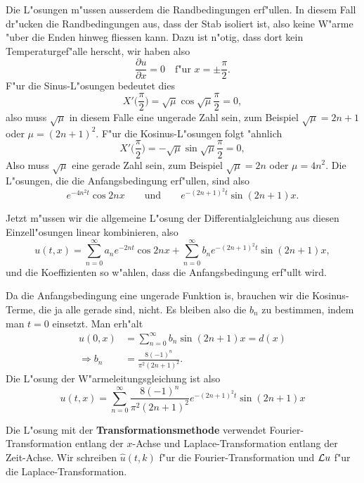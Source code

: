 {\begin{loesung}
Die L"osungen m"ussen ausserdem die Randbedingungen erf"ullen.
In diesem Fall dr"ucken die Randbedingungen aus, dass der Stab isoliert ist,
also keine W"arme "uber die Enden hinweg fliessen kann. Dazu ist n"otig,
dass dort kein Temperaturgef"alle herscht, wir haben also
\[\frac{\partial u}{\partial x}=0\quad\text{f"ur $x=\pm\frac{\pi}2$}.\]
F"ur die Sinus-L"osungen bedeutet dies
\[
X'\biggl(\frac{\pi}2\biggr)=\sqrt{\mu}\cos \sqrt{\mu}\frac{\pi}2=0,
\]
also muss $\sqrt{\mu}$ in diesem Falle eine ungerade Zahl sein,
zum Beispiel $\sqrt{\mu}=2n+1$ oder
$\mu=(2n+1)^2$.
F"ur die Kosinus-L"osungen folgt "ahnlich
\[
X'\biggl(\frac{\pi}2\biggr)=-\sqrt{\mu}\sin\sqrt{\mu}\frac{\pi}2=0,
\]
Also muss $\sqrt{\mu}$ eine gerade Zahl sein, zum Beispiel $\sqrt{\mu}=2n$ oder
$\mu=4n^2$.
Die L"osungen, die die Anfangsbedingung
erf"ullen, sind also
\[
e^{-4n^2t}\cos 2nx\qquad\text{und}\qquad e^{-(2n+1)^2t}\sin(2n+1)x.
\]

Jetzt m"ussen wir die allgemeine L"osung der Differentialgleichung aus
diesen Einzell"osungen linear kombinieren, also
\[
u(t,x)=
\sum_{n=0}^\infty a_ne^{-2nt}\cos 2nx +\sum_{n=0}^\infty b_n e^{-(2n+1)^2t}\sin(2n+1)x,
\]
und die Koeffizienten so w"ahlen, dass die Anfangsbedingung erf"ullt wird.

Da die Anfangsbedingung eine ungerade Funktion is, brauchen wir die Kosinus-Terme,
die ja alle gerade sind, nicht. Es bleiben also die $b_n$ zu bestimmen, indem
man $t=0$ einsetzt. Man erh"alt
\begin{align*}
u(0,x)&=\sum_{n=0}^\infty b_n\sin(2n+1)x=d(x)
\\
\Rightarrow
b_n&=\frac{8(-1)^n}{\pi^2(2n+1)^2}.
\end{align*}
Die L"osung der W"armeleitungsgleichung ist also
\[
u(t,x)=
\sum_{n=0}^\infty \frac{8(-1)^n}{\pi^2(2n+1)^2}e^{-(2n+1)^2t}\sin(2n+1)x
\]

Die L"osung mit der {\bf Transformationsmethode}
verwendet Fourier-Transformation
entlang der $x$-Achse und Laplace-Transformation entlang der Zeit-Achse.
Wir schreiben $\hat u(t,k)$ f"ur die Fourier-Transformation und ${\cal L} u$
f"ur die Laplace-Transformation.


\end{loesung}}
